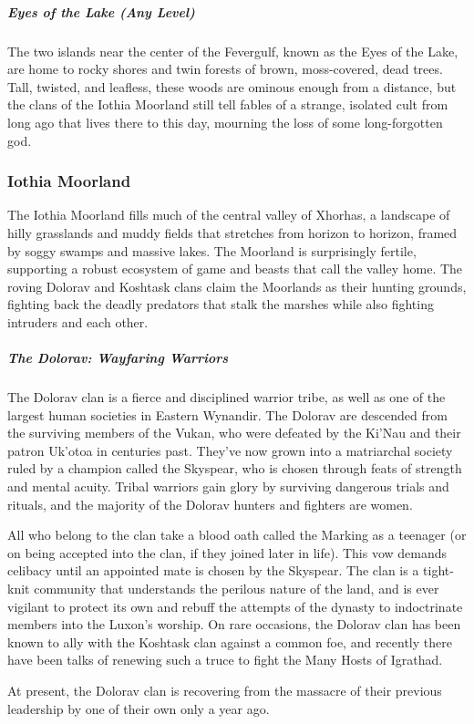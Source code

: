 \documentclass[10pt,a4paper,twoside,bg=print,twocolumn,openany,nodeprecatedcode]{dndbook}
\begin{document}
\subparagraph{Eyes of the Lake (Any Level)}
The two islands near the center of the Fevergulf, known as the Eyes of the Lake, are home to rocky shores and twin forests of brown, moss-covered, dead trees. Tall, twisted, and leafless, these woods are ominous enough from a distance, but the clans of the Iothia Moorland still tell fables of a strange, isolated cult from long ago that lives there to this day, mourning the loss of some long-forgotten god.

\subsubsection{Iothia Moorland}
The Iothia Moorland fills much of the central valley of Xhorhas, a landscape of hilly grasslands and muddy fields that stretches from horizon to horizon, framed by soggy swamps and massive lakes. The Moorland is surprisingly fertile, supporting a robust ecosystem of game and beasts that call the valley home. The roving Dolorav and Koshtask clans claim the Moorlands as their hunting grounds, fighting back the deadly predators that stalk the marshes while also fighting intruders and each other.

\subparagraph{The Dolorav: Wayfaring Warriors}
The Dolorav clan is a fierce and disciplined warrior tribe, as well as one of the largest human societies in Eastern Wynandir. The Dolorav are descended from the surviving members of the Vukan, who were defeated by the Ki'Nau and their patron Uk'otoa in centuries past. They've now grown into a matriarchal society ruled by a champion called the Skyspear, who is chosen through feats of strength and mental acuity. Tribal warriors gain glory by surviving dangerous trials and rituals, and the majority of the Dolorav hunters and fighters are women.

All who belong to the clan take a blood oath called the Marking as a teenager (or on being accepted into the clan, if they joined later in life). This vow demands celibacy until an appointed mate is chosen by the Skyspear. The clan is a tight-knit community that understands the perilous nature of the land, and is ever vigilant to protect its own and rebuff the attempts of the dynasty to indoctrinate members into the Luxon's worship. On rare occasions, the Dolorav clan has been known to ally with the Koshtask clan against a common foe, and recently there have been talks of renewing such a truce to fight the Many Hosts of Igrathad.

At present, the Dolorav clan is recovering from the massacre of their previous leadership by one of their own only a year ago.
\end{document}
